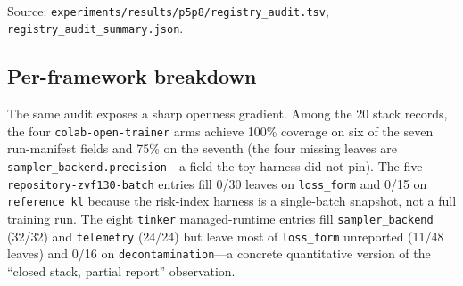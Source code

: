 \begin{table}[t]
\centering
\caption{Per-item MIN-REPORT coverage on the shipped 20 stack records
(\texttt{loss\_form} has 6 leaves, \texttt{sampler\_backend} has 4,
the other items have 2--3; counts are filled-leaves / total-leaves).}
\label{tab:p6-coverage}
\small
{}\\
\footnotesize{Source: \texttt{experiments/results/p5p8/registry\_audit.tsv},
\texttt{registry\_audit\_summary.json}.}
\end{table}

\subsection{Per-framework breakdown}
The same audit exposes a sharp openness gradient. Among the 20 stack
records, the four \texttt{colab-open-trainer} arms achieve 100\% coverage
on six of the seven run-manifest fields and 75\% on the seventh (the four missing
leaves are \texttt{sampler\_backend.precision}---a field the toy harness
did not pin). The five \texttt{repository-zvf130-batch} entries fill 0/30
leaves on \texttt{loss\_form} and 0/15 on \texttt{reference\_kl} because
the risk-index harness is a single-batch snapshot, not a full training
run. The eight \texttt{tinker} managed-runtime entries fill
\texttt{sampler\_backend} (32/32) and \texttt{telemetry} (24/24) but
leave most of \texttt{loss\_form} unreported (11/48 leaves) and 0/16 on
\texttt{decontamination}---a concrete quantitative version of the
``closed stack, partial report'' observation.

